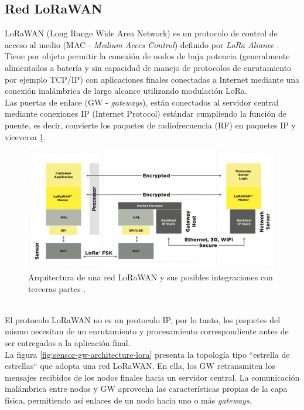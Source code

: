 \subsection{Red LoRaWAN}
LoRaWAN (Long Range Wide Area Network) es un protocolo de control de acceso al medio (MAC - \textit{Medium Acces Control}) definido por \textit{LoRa Aliance} \citep{lora_alliance}. Tiene por objeto permitir la conexión de nodos de baja potencia (generalmente alimentados a batería y sin capacidad de manejo de protocolos de enrutamiento por ejemplo TCP/IP) con aplicaciones finales conectadas a Internet mediante una conexión inalámbrica de largo alcance utilizando modulación LoRa.\\
Las puertas de enlace (GW - \textit{gateways}), están conectados al servidor central mediante conexiones IP (Internet Protocol) estándar cumpliendo la función de puente, es decir, convierte los paquetes de radiofrecuencia (RF) en paquetes IP y viceversa \ref{fig:arqlorawan}.\\
\begin{figure}[h]
	\centering
	\includegraphics[width=0.9\linewidth]{Figures/arq_lorawan_2}
	\caption{Arquitectura de una red LoRaWAN y sus posibles integraciones con terceras partes \citep{lora_alliance}.}
	\label{fig:arqlorawan}
\end{figure}\\
El protocolo LoRaWAN no es un protocolo IP, por lo tanto, los paquetes del mismo necesitan de un enrutamiento y procesamiento correspondiente antes de ser entregados a la aplicación final.\\
La figura \ref{fig:sensor-gw-architecture-lora} presenta la topología tipo ``estrella de estrellas`` que adopta una red LoRaWAN. En ella, los GW retransmiten los mensajes recibidos de los nodos finales hacia un servidor central. La comunicación inalámbrica entre nodos y GW aprovecha las características propias de la capa física, permitiendo así enlaces de un nodo hacia uno o más \textit{gateways}.\\
